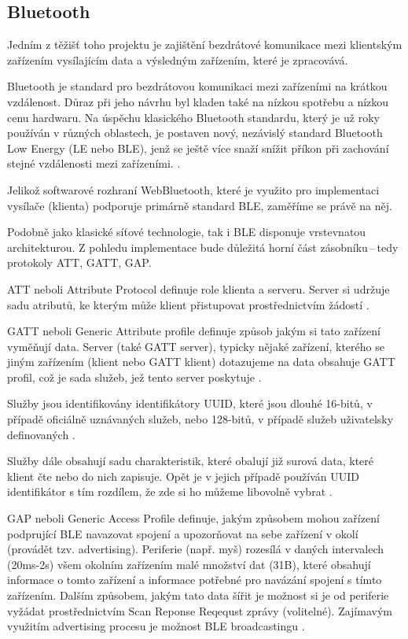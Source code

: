 \documentclass[10pt]{article}
\begin{document}
\subsection{Bluetooth}
\par Jedním z těžišť toho projektu je zajištění bezdrátové komunikace mezi klientským zařízením vysílajícím data a výsledným zařízením, které je zpracovává.
\par Bluetooth je standard pro bezdrátovou komunikaci mezi zařízeními na krátkou vzdálenost. Důraz při jeho návrhu byl kladen také na nízkou spotřebu a nízkou cenu hardwaru. Na úspěchu klasického Bluetooth standardu, který je už roky používán v různých oblastech, je postaven nový, nezávislý standard Bluetooth Low Energy (LE nebo BLE), jenž se ještě více snaží snížit příkon při zachování stejné vzdálenosti mezi zařízeními. \cite[str.~6]{gupta}.
\par Jelikož softwarové rozhraní WebBluetooth, které je využito pro implementaci vysílače (klienta) podporuje primárně standard BLE, zaměříme se právě na něj.
\par Podobně jako klasické síťové technologie, tak i BLE disponuje vrstevnatou architekturou. Z pohledu implementace bude důležitá horní část zásobníku\,--\,tedy protokoly ATT, GATT, GAP.
\par ATT neboli Attribute Protocol definuje role klienta a serveru. Server si udržuje sadu atributů, ke kterým může klient přistupovat prostřednictvím žádostí \cite{gomez}.
\par GATT neboli Generic Attribute profile definuje způsob jakým si tato zařízení vyměňují data. Server (také GATT server), typicky nějaké zařízení, kterého se jiným zařízením (klient nebo GATT klient) dotazujeme na data obsahuje GATT profil, což je sada služeb, jež tento server poskytuje \cite{townsend-gatt}.
\par Služby jsou identifikovány identifikátory UUID, které jsou dlouhé 16-bitů, v případě oficiálně uznávaných služeb, nebo 128-bitů, v případě služeb uživatelsky definovaných \cite{townsend-gatt}.
\par Služby dále obsahují sadu charakteristik, které obalují již surová data, které klient čte nebo do nich zapisuje. Opět je v jejich případě používán UUID identifikátor s tím rozdílem, že zde si ho můžeme libovolně vybrat \cite{townsend-gatt}.
\par GAP neboli Generic Access Profile definuje, jakým způsobem mohou zařízení podprující BLE navazovat spojení a upozorňovat na sebe zařízení v okolí (provádět tzv. advertising). Periferie (např. myš) rozesílá v daných intervalech (20ms-2s) všem okolním zařízením malé množství dat (31B), které obsahují informace o tomto zařízení a informace potřebné pro navázání spojení s tímto zařízením. Dalším způsobem, jakým tato data šířit je možnost si je od periferie vyžádat prostřednictvím Scan Reponse Reqequst zprávy (volitelné). Zajímavým využitím advertising procesu je možnost BLE broadcastingu \cite{townsend-gap}.
\end{document}
